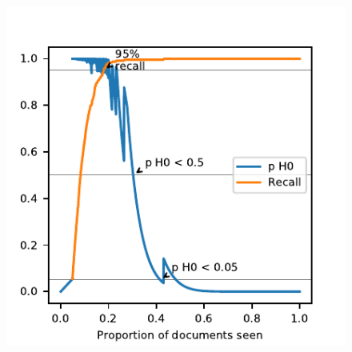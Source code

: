 \documentclass[9pt, aspectratio=169]{beamer}
\begin{document}
\begin{frame}
\begin{columns}
		\begin{column}{0.5\linewidth}
			\begin{figure}
				\includegraphics[width=\linewidth]{../manuscript/2_figs_h0_paths_ProtonBeam}
			\end{figure}
		\end{column}
	\end{columns}
\end{frame}
\end{document}
